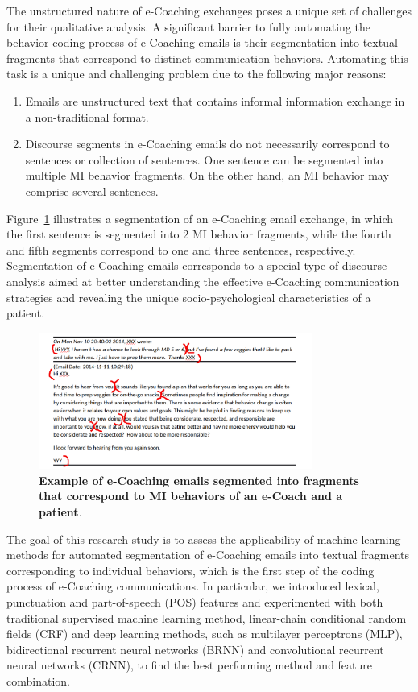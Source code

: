 \documentclass{amia}
\begin{document}
The unstructured nature of e-Coaching exchanges poses a unique set of challenges for their qualitative analysis. A significant barrier to fully automating the behavior coding process of e-Coaching emails is their segmentation into textual fragments that correspond to distinct communication behaviors. Automating this task is a unique and challenging problem due to the following major reasons:

\begin{enumerate}
\item Emails are unstructured text that contains informal information exchange in a non-traditional format.
\item Discourse segments in e-Coaching emails do not necessarily correspond to sentences or collection of sentences. One sentence can be segmented into multiple MI behavior fragments. On the other hand, an MI behavior may comprise several sentences.
\end{enumerate}

Figure~\ref{fig:text-segment} illustrates a segmentation of an e-Coaching email exchange, in which the first sentence is segmented into 2 MI behavior fragments, while the fourth and fifth segments correspond to one and three sentences, respectively. Segmentation of e-Coaching emails corresponds to a special type of discourse analysis \cite{webber2012discourse} aimed at better understanding the effective e-Coaching communication strategies and revealing the unique socio-psychological characteristics of a patient.

\begin{figure}[!htb]
    \centering
    \includegraphics[width=0.8\textwidth]{figures/segment-example.png}
    \caption{\textbf{Example of e-Coaching emails segmented into fragments that correspond to MI behaviors of an e-Coach and a patient}.}
    \label{fig:text-segment}
\end{figure}

The goal of this research study is to assess the applicability of machine learning methods for automated segmentation of e-Coaching emails into textual fragments corresponding to individual behaviors, which is the first step of the coding process of e-Coaching communications. In particular, we introduced lexical, punctuation and  part-of-speech (POS) features and experimented with both traditional supervised machine learning method, linear-chain conditional random fields (CRF) and deep learning methods, such as multilayer perceptrons (MLP), bidirectional recurrent neural networks (BRNN) and convolutional recurrent neural networks (CRNN), to find the best performing method and feature combination. 
\end{document}
